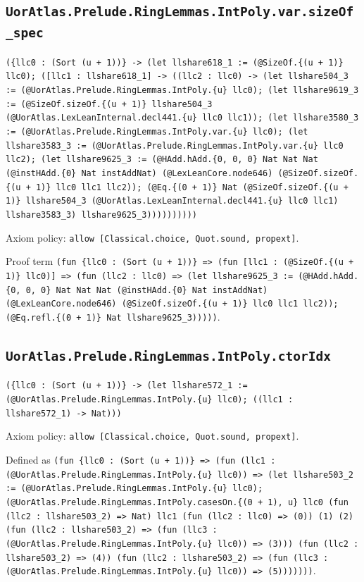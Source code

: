 \documentclass[11pt]{article}
\begin{document}
\subsection*{\texttt{UorAtlas.Prelude.RingLemmas.IntPoly.var.sizeOf\_spec}}
\noindent\texttt{(\{llc0 : (Sort (u + 1))\} -> (let llshare618\_1 := (@SizeOf.\{(u + 1)\} llc0); ([llc1 : llshare618\_1] -> ((llc2 : llc0) -> (let llshare504\_3 := (@UorAtlas.Prelude.RingLemmas.IntPoly.\{u\} llc0); (let llshare9619\_3 := (@SizeOf.sizeOf.\{(u + 1)\} llshare504\_3 (@UorAtlas.LexLeanInternal.decl441.\{u\} llc0 llc1)); (let llshare3580\_3 := (@UorAtlas.Prelude.RingLemmas.IntPoly.var.\{u\} llc0); (let llshare3583\_3 := (@UorAtlas.Prelude.RingLemmas.IntPoly.var.\{u\} llc0 llc2); (let llshare9625\_3 := (@HAdd.hAdd.\{0, 0, 0\} Nat Nat Nat (@instHAdd.\{0\} Nat instAddNat) (@LexLeanCore.node646) (@SizeOf.sizeOf.\{(u + 1)\} llc0 llc1 llc2)); (@Eq.\{(0 + 1)\} Nat (@SizeOf.sizeOf.\{(u + 1)\} llshare504\_3 (@UorAtlas.LexLeanInternal.decl441.\{u\} llc0 llc1) llshare3583\_3) llshare9625\_3))))))))))}\par
\noindent Axiom policy: \texttt{allow [Classical.choice, Quot.sound, propext]}.\par
\noindent Proof term \texttt{(fun \{llc0 : (Sort (u + 1))\} => (fun [llc1 : (@SizeOf.\{(u + 1)\} llc0)] => (fun (llc2 : llc0) => (let llshare9625\_3 := (@HAdd.hAdd.\{0, 0, 0\} Nat Nat Nat (@instHAdd.\{0\} Nat instAddNat) (@LexLeanCore.node646) (@SizeOf.sizeOf.\{(u + 1)\} llc0 llc1 llc2)); (@Eq.refl.\{(0 + 1)\} Nat llshare9625\_3)))))}.\par
\subsection*{\texttt{UorAtlas.Prelude.RingLemmas.IntPoly.ctorIdx}}
\noindent\texttt{(\{llc0 : (Sort (u + 1))\} -> (let llshare572\_1 := (@UorAtlas.Prelude.RingLemmas.IntPoly.\{u\} llc0); ((llc1 : llshare572\_1) -> Nat)))}\par
\noindent Axiom policy: \texttt{allow [Classical.choice, Quot.sound, propext]}.\par
\noindent Defined as \texttt{(fun \{llc0 : (Sort (u + 1))\} => (fun (llc1 : (@UorAtlas.Prelude.RingLemmas.IntPoly.\{u\} llc0)) => (let llshare503\_2 := (@UorAtlas.Prelude.RingLemmas.IntPoly.\{u\} llc0); (@UorAtlas.Prelude.RingLemmas.IntPoly.casesOn.\{(0 + 1), u\} llc0 (fun (llc2 : llshare503\_2) => Nat) llc1 (fun (llc2 : llc0) => (0)) (1) (2) (fun (llc2 : llshare503\_2) => (fun (llc3 : (@UorAtlas.Prelude.RingLemmas.IntPoly.\{u\} llc0)) => (3))) (fun (llc2 : llshare503\_2) => (4)) (fun (llc2 : llshare503\_2) => (fun (llc3 : (@UorAtlas.Prelude.RingLemmas.IntPoly.\{u\} llc0)) => (5)))))))}.\par
\end{document}
